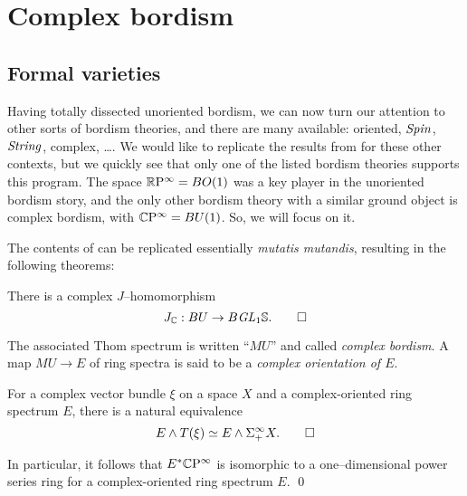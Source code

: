 
\chapter{Complex bordism}\label{ComplexBordismChapter}




\section{Formal varieties}\label{FormalVarietiesLecture}

Having totally dissected unoriented bordism, we can now turn our attention to other sorts of bordism theories, and there are many available: oriented, $\mathit{Spin}$, $\mathit{String}$, complex, \ldots.  We would like to replicate the results from  for these other contexts, but we quickly see that only one of the listed bordism theories supports this program.  The space $\mathbb R\mathrm P^\infty = BO(1)$ was a key player in the unoriented bordism story, and the only other bordism theory with a similar ground object is complex bordism, with $\mathbb{C}\mathrm P^\infty = BU(1)$.  So, we will focus on it.

The contents of  can be replicated essentially \textit{mutatis mutandis}, resulting in the following theorems:
\begin{theorem}
There is a complex $J$--homomorphism \[J_{\mathbb{C}}: BU \to B \mathit{GL}_1 \mathbb S. \qed \]
\end{theorem}

\begin{definition}
The associated Thom spectrum is written ``$MU$'' and called \textit{complex bordism}.  A map $MU \to E$ of ring spectra is said to be a \textit{complex orientation of $E$}.
\end{definition}

\begin{theorem}
For a complex vector bundle $\xi$ on a space $X$ and a complex-oriented ring spectrum $E$, there is a natural equivalence \[E \wedge T(\xi) \simeq E \wedge \Sigma^\infty_+ X. \qed\]
\end{theorem}

\begin{corollary}\label{CPinftyNiceCalculation}
In particular, it follows that $E^* \mathbb{C}\mathrm P^\infty$ is isomorphic to a one--dimensional power series ring for a complex-oriented ring spectrum $E$. \qed
\end{corollary}


